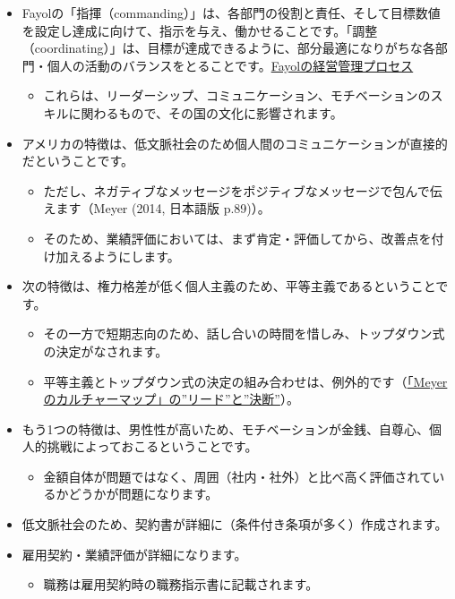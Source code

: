 \documentclass[
]{book}
\providecommand{\tightlist}{%
  \setlength{\itemsep}{0pt}\setlength{\parskip}{0pt}}
\begin{document}
\begin{itemize}
\item
  Fayolの「指揮（commanding）」は、各部門の役割と責任、そして目標数値を設定し達成に向けて、指示を与え、働かせることです。「調整（coordinating）」は、目標が達成できるように、部分最適になりがちな各部門・個人の活動のバランスをとることです。\protect\hyperlink{fayol}{Fayolの経営管理プロセス}

  \begin{itemize}
  \tightlist
  \item
    これらは、リーダーシップ、コミュニケーション、モチベーションのスキルに関わるもので、その国の文化に影響されます。
  \end{itemize}
\item
  アメリカの特徴は、低文脈社会のため個人間のコミュニケーションが直接的だということです。

  \begin{itemize}
  \item
    ただし、ネガティブなメッセージをポジティブなメッセージで包んで伝えます（Meyer (2014, 日本語版 p.89)）。
  \item
    そのため、業績評価においては、まず肯定・評価してから、改善点を付け加えるようにします。
  \end{itemize}
\item
  次の特徴は、権力格差が低く個人主義のため、平等主義であるということです。

  \begin{itemize}
  \item
    その一方で短期志向のため、話し合いの時間を惜しみ、トップダウン式の決定がなされます。
  \item
    平等主義とトップダウン式の決定の組み合わせは、例外的です（\protect\hyperlink{meyer}{「Meyerのカルチャーマップ」の''リード''と''決断''}）。
  \end{itemize}
\item
  もう1つの特徴は、男性性が高いため、モチベーションが金銭、自尊心、個人的挑戦によっておこるということです。

  \begin{itemize}
  \tightlist
  \item
    金額自体が問題ではなく、周囲（社内・社外）と比べ高く評価されているかどうかが問題になります。
  \end{itemize}
\item
  低文脈社会のため、契約書が詳細に（条件付き条項が多く）作成されます。
\item
  雇用契約・業績評価が詳細になります。

  \begin{itemize}
  \tightlist
  \item
    職務は雇用契約時の職務指示書に記載されます。
  \end{itemize}
\end{itemize}
\end{document}
